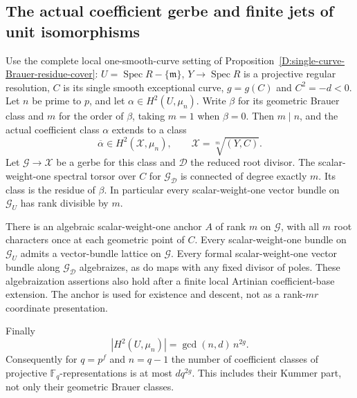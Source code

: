 \subsection{The actual coefficient gerbe and finite jets of unit isomorphisms}

\begin{proposition}
\label{D:one-curve-coefficient-root-gerbe}
Use the complete local one-smooth-curve setting of
Proposition~\ref{D:single-curve-Brauer-residue-cover}:
$U=\operatorname{Spec}R-\{\mathfrak m\}$,
$Y\to\operatorname{Spec}R$ is a projective regular resolution,
$C$ is its single smooth exceptional curve, $g=g(C)$ and
$C^2=-d<0$. Let $n$ be prime to $p$, and let
$\alpha\in H^2(U,\mu_n)$. Write $\beta$ for its geometric
Brauer class and $m$ for the order of $\beta$, taking $m=1$
when $\beta=0$. Then $m\mid n$, and the actual coefficient
class $\alpha$ extends to a class
\[
 \overline\alpha\in H^2(\mathcal X,\mu_n),\qquad
             \mathcal X=\sqrt[m]{(Y,C)}.                \tag{D.UJ.1}
\]
Let $\mathcal G\to\mathcal X$ be a gerbe for this class and
$\mathcal D$ the reduced root divisor. The scalar-weight-one
spectral torsor over $C$ for $\mathcal G_{\mathcal D}$ is
connected of degree exactly $m$. Its class is the residue of
$\beta$. In particular every scalar-weight-one vector bundle
on $\mathcal G_U$ has rank divisible by $m$.

There is an algebraic scalar-weight-one anchor $A$ of rank $m$
on $\mathcal G$, with all $m$ root characters once at each
geometric point of $C$. Every scalar-weight-one bundle on
$\mathcal G_U$ admits a vector-bundle lattice on $\mathcal G$.
Every formal scalar-weight-one vector bundle along
$\mathcal G_{\mathcal D}$ algebraizes, as do maps with any
fixed divisor of poles. These algebraization assertions also
hold after a finite local Artinian coefficient-base extension.
The anchor is used for existence and descent, not as a rank-$mr$
coordinate presentation.

Finally
\[
 |H^2(U,\mu_n)|=\gcd(n,d)\,n^{2g}.                     \tag{D.UJ.2}
\]
Consequently for $q=p^f$ and $n=q-1$ the number of coefficient
classes of projective $\mathbb F_q$-representations is at most
$dq^{2g}$. This includes their Kummer part, not only their
geometric Brauer classes.
\end{proposition}

